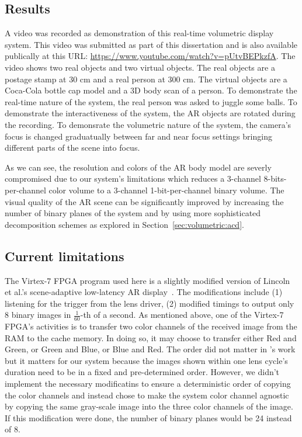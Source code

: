 \subsection{Results}
A video was recorded as demonstration of this real-time volumetric display system. This video was submitted as part of this dissertation and is also available publically at this URL: \url{https://www.youtube.com/watch?v=pUtvBEPkzfA}. 
The video shows two real objects and two virtual objects. 
The real objects are a postage stamp at 30 cm and a real person at 300 cm.
The virtual objects are a Coca-Cola bottle cap model and a 3D body scan of a person.
To demonstrate the real-time nature of the system, the real person was asked to juggle some balls.
To demonstrate the interactiveness of the system, the AR objects are rotated during the recording.
To demonsrate the volumetric nature of the system, the camera's focus is changed graduatually between far and near focus settings bringing different parts of the scene into focus.

As we can see, the resolution and colors of the AR body model are severly compromised due to our system's limitations which reduces a 3-channel 8-bits-per-channel color volume to a 3-channel 1-bit-per-channel binary volume.
The visual quality of the AR scene can be significantly improved by increasing the number of binary planes of the system and by using more sophisticated decomposition schemes as explored in Section~\ref{sec:volumetric:acd}.

\subsection{Current limitations}
\label{sec:volumetric:rts:limitations}
The Virtex-7 FPGA program used here is a slightly modified version of Lincoln et al.'s scene-adaptive low-latency AR display~\cite{Lincoln2017scene}.
The modifications include (1) listening for the trigger from the lens driver, (2) modified timings to output only 8 binary images in $\frac{1}{60}$-th of a second.
As mentioned above, one of the Virtex-7 FPGA's activities is to transfer two color channels of the received image from the RAM to the cache memory.
In doing so, it may choose to transfer either Red and Green, or Green and Blue, or Blue and Red.
The order did not matter in \cite{Lincoln2017scene}'s work but it matters for our system because the images shown within one lens cycle's duration need to be in a fixed and pre-determined order. 
However, we didn't implement the necessary modificatins to ensure a deterministic order of copying the color channels and instead chose to make the system color channel agnostic by copying the same gray-scale image into the three color channels of the image. 
If this modification were done, the number of binary planes would be 24 instead of 8.


